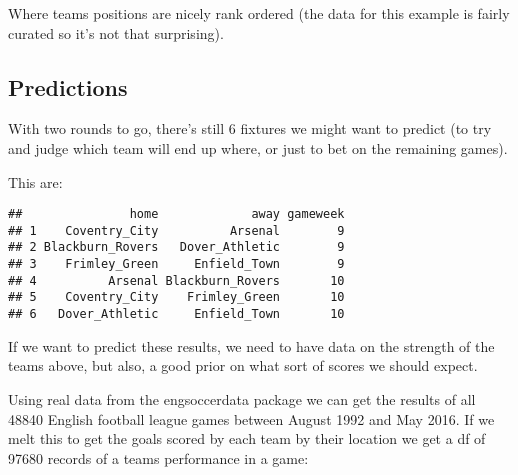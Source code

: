 \documentclass[]{article}
\newenvironment{Shaded}{\begin{snugshade}}{\end{snugshade}}
\newcommand{\KeywordTok}[1]{\textcolor[rgb]{0.13,0.29,0.53}{\textbf{#1}}}
\newcommand{\DecValTok}[1]{\textcolor[rgb]{0.00,0.00,0.81}{#1}}
\newcommand{\StringTok}[1]{\textcolor[rgb]{0.31,0.60,0.02}{#1}}
\newcommand{\CommentTok}[1]{\textcolor[rgb]{0.56,0.35,0.01}{\textit{#1}}}
\newcommand{\OperatorTok}[1]{\textcolor[rgb]{0.81,0.36,0.00}{\textbf{#1}}}
\newcommand{\NormalTok}[1]{#1}
\begin{document}
Where teams positions are nicely rank ordered (the data for this example
is fairly curated so it's not that surprising).

\subsection{Predictions}\label{predictions}

With two rounds to go, there's still 6 fixtures we might want to predict
(to try and judge which team will end up where, or just to bet on the
remaining games).

This are:

\begin{Shaded}
\end{Shaded}

\begin{verbatim}
##               home             away gameweek
## 1    Coventry_City          Arsenal        9
## 2 Blackburn_Rovers   Dover_Athletic        9
## 3    Frimley_Green     Enfield_Town        9
## 4          Arsenal Blackburn_Rovers       10
## 5    Coventry_City    Frimley_Green       10
## 6   Dover_Athletic     Enfield_Town       10
\end{verbatim}

If we want to predict these results, we need to have data on the
strength of the teams above, but also, a good prior on what sort of
scores we should expect.

Using real data from the engsoccerdata package we can get the results of
all 48840 English football league games between August 1992 and May
2016. If we melt this to get the goals scored by each team by their
location we get a df of 97680 records of a teams performance in a game:
\end{document}
